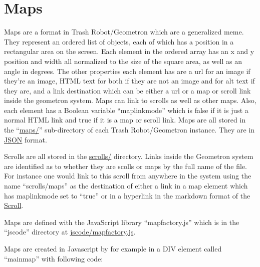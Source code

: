 
\section{Maps}\label{maps}

Maps are a format in Trash Robot/Geometron which are a generalized meme.
They represent an ordered list of objects, each of which has a position
in a rectangular area on the screen. Each element in the ordered array
has an x and y position and width all normalized to the size of the
square area, as well as an angle in degrees. The other properties each
element has are a url for an image if they're an image, HTML text for
both if they are not an image and for alt text if they are, and a link
destination which can be either a url or a map or scroll link inside the
geometron system. Maps can link to scrolls as well as other maps. Also,
each element has a Boolean variable ``maplinkmode'' which is false if it
is just a normal HTML link and true if it is a map or scroll link. Maps
are all stored in the ``\url{maps/}'' sub-directory of each Trash
Robot/Geometron instance. They are in
\href{https://www.json.org/json-en.html}{JSON} format.

Scrolls are all stored in the \url{scrolls/} directory. Links inside the
Geometron system are identified as to whether they are scolls or maps by
the full name of the file. For instance one would link to this scroll
from anywhere in the system using the name ``scrolls/maps'' as the
destination of either a link in a map element which has maplinkmode set
to ``true'' or in a hyperlink in the markdown format of the
\href{scrolls/scrolls}{Scroll}.

Maps are defined with the JavaScript library ``mapfactory.js'' which is
in the ``jscode'' directory at \url{jscode/mapfactory.js}.

Maps are created in Javascript by for example in a DIV element called
``mainmap'' with following code:

